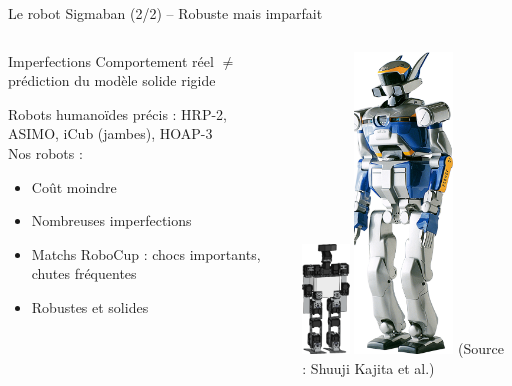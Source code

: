 \begin{frame}{Le robot Sigmaban (2/2) -- Robuste mais imparfait}
    \begin{columns}
        \begin{column}{0.55\linewidth}
            \begin{block}{Imperfections}
                Comportement réel $\neq$
                prédiction du modèle solide rigide
            \end{block}
            Robots humanoïdes précis :
            HRP-2, ASIMO, iCub (jambes), HOAP-3\\
            \vspace{1.0em}
            Nos robots :
            \begin{itemize}
                \item Coût moindre
                \item Nombreuses imperfections
                \item Matchs RoboCup : chocs importants, chutes fréquentes
                \item Robustes et solides
            \end{itemize}
        \end{column}
        \begin{column}{0.45\linewidth}
            \vspace{-1.2em}
            \begin{center}
            \includegraphics[height=2.9cm]{../media/sigmaban_cao2.png}
            \hspace{0.5cm}
            \includegraphics[height=8cm]{../media/hrp2.jpg}
            \newline
            \scriptsize
            (Source : Shuuji Kajita et al.)
            \end{center}
        \end{column}
    \end{columns}
\end{frame}


